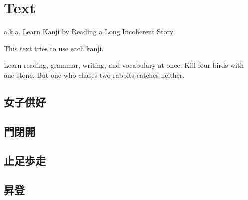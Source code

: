 \chapter{Text}

a.k.a. Learn Kanji by Reading a Long Incoherent Story

This text tries to use each kanji.

Learn reading, grammar, writing, and vocabulary at once.
Kill four birds with one stone.
But one who chases two rabbits catches neither.

\newcommand\hlp[1]{%
    {%
        \parindent0em%
        \par%
        \vspace{\myspacing}%
        {\fontsize{10pt}{10pt}\selectfont#1}%
        \vspace{\myspacing}%
        \par%
    }%
}

\section{女子供好}



\section{門閉開}



\section{止足歩走}




\section{昇登}

